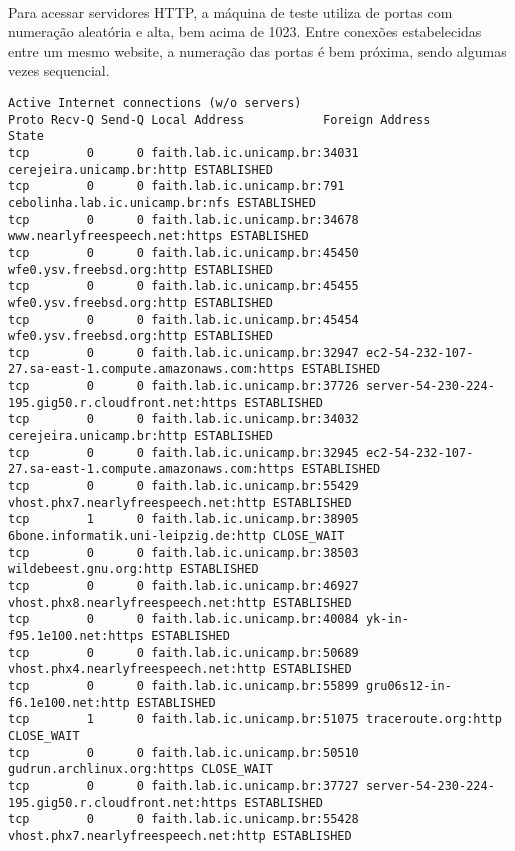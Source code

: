 \documentclass[a4paper,10pt,oneside,final,titlepage,onecolumn]{article}
\begin{document}
\paragraph{}Para acessar servidores HTTP, a máquina de teste utiliza de portas com numeração aleatória e alta, bem acima de 1023. Entre conexões estabelecidas entre um mesmo website, a numeração das portas é bem próxima, sendo algumas vezes sequencial.
\begin{lstlisting}
Active Internet connections (w/o servers)
Proto Recv-Q Send-Q Local Address           Foreign Address         State      
tcp        0      0 faith.lab.ic.unicamp.br:34031 cerejeira.unicamp.br:http ESTABLISHED
tcp        0      0 faith.lab.ic.unicamp.br:791 cebolinha.lab.ic.unicamp.br:nfs ESTABLISHED
tcp        0      0 faith.lab.ic.unicamp.br:34678 www.nearlyfreespeech.net:https ESTABLISHED
tcp        0      0 faith.lab.ic.unicamp.br:45450 wfe0.ysv.freebsd.org:http ESTABLISHED
tcp        0      0 faith.lab.ic.unicamp.br:45455 wfe0.ysv.freebsd.org:http ESTABLISHED
tcp        0      0 faith.lab.ic.unicamp.br:45454 wfe0.ysv.freebsd.org:http ESTABLISHED
tcp        0      0 faith.lab.ic.unicamp.br:32947 ec2-54-232-107-27.sa-east-1.compute.amazonaws.com:https ESTABLISHED
tcp        0      0 faith.lab.ic.unicamp.br:37726 server-54-230-224-195.gig50.r.cloudfront.net:https ESTABLISHED
tcp        0      0 faith.lab.ic.unicamp.br:34032 cerejeira.unicamp.br:http ESTABLISHED
tcp        0      0 faith.lab.ic.unicamp.br:32945 ec2-54-232-107-27.sa-east-1.compute.amazonaws.com:https ESTABLISHED
tcp        0      0 faith.lab.ic.unicamp.br:55429 vhost.phx7.nearlyfreespeech.net:http ESTABLISHED
tcp        1      0 faith.lab.ic.unicamp.br:38905 6bone.informatik.uni-leipzig.de:http CLOSE_WAIT 
tcp        0      0 faith.lab.ic.unicamp.br:38503 wildebeest.gnu.org:http ESTABLISHED
tcp        0      0 faith.lab.ic.unicamp.br:46927 vhost.phx8.nearlyfreespeech.net:http ESTABLISHED
tcp        0      0 faith.lab.ic.unicamp.br:40084 yk-in-f95.1e100.net:https ESTABLISHED
tcp        0      0 faith.lab.ic.unicamp.br:50689 vhost.phx4.nearlyfreespeech.net:http ESTABLISHED
tcp        0      0 faith.lab.ic.unicamp.br:55899 gru06s12-in-f6.1e100.net:http ESTABLISHED
tcp        1      0 faith.lab.ic.unicamp.br:51075 traceroute.org:http     CLOSE_WAIT 
tcp        0      0 faith.lab.ic.unicamp.br:50510 gudrun.archlinux.org:https CLOSE_WAIT 
tcp        0      0 faith.lab.ic.unicamp.br:37727 server-54-230-224-195.gig50.r.cloudfront.net:https ESTABLISHED
tcp        0      0 faith.lab.ic.unicamp.br:55428 vhost.phx7.nearlyfreespeech.net:http ESTABLISHED

\end{lstlisting}
\end{document}
